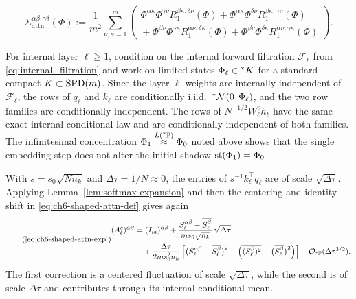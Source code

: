 \begin{theorem}
\begin{equation}
\label{eq:ch6-attn-diff-term}
\Sigma_{\mathrm{attn}}^{\alpha\beta,\gamma\delta}(\Phi) := \frac{1}{m^2}\sum_{\nu,\kappa=1}^m
\begin{pmatrix}
  \Phi^{\alpha\kappa}\Phi^{\gamma\nu} R_1^{\beta\kappa,\delta\nu}(\Phi) + \Phi^{\alpha\kappa}\Phi^{\delta\nu} R_1^{\beta\kappa,\gamma\nu}(\Phi) \\[0.3em]
  {}+ \Phi^{\beta\nu}\Phi^{\gamma\kappa} R_1^{\alpha\nu,\delta\kappa}(\Phi) + \Phi^{\beta\nu}\Phi^{\delta\kappa} R_1^{\alpha\nu,\gamma\kappa}(\Phi)
\end{pmatrix}.
\end{equation}
\end{theorem}

\begin{proofsketch}
For internal layer $\ell \ge 1$, condition on the internal forward filtration $\mathcal{F}_\ell$ from \eqref{eq:internal_filtration}
and work on limited states $\Phi_\ell \in {}^*K$ for a standard compact $K \subset \operatorname{SPD}(m)$. Since the layer-$\ell$ weights are internally independent of $\mathcal{F}_\ell$, the rows of $q_\ell$ and $k_\ell$ are conditionally i.i.d.\ ${}^*\mathcal{N}(0, \Phi_\ell)$, and the two row families are conditionally independent. The rows of $N^{-1/2} W_\ell^v h_\ell$ have the same exact internal conditional law and are conditionally independent of both families. The infinitesimal concentration $\Phi_1 \stackrel{L({}^*\mathbb{P})}{\approx} \Phi_0$ noted above shows that the single embedding step does not alter the initial shadow $\operatorname{st}(\Phi_1) = \Phi_0$.

With $s = s_0 \sqrt{N n_k}$ and $\Delta\tau = 1/N \approx 0$, the entries of $s^{-1} k_\ell^\top q_\ell$ are of scale $\sqrt{\Delta\tau}$. Applying Lemma~\ref{lem:softmax-expansion} and then the centering and identity shift in \eqref{eq:ch6-shaped-attn-def} gives again
\begin{equation*}
\tag{\ref{eq:ch6-shaped-attn-exp}}
\begin{aligned}
(A_\ell^s)^{\alpha\beta}
&= (I_m)^{\alpha\beta}
  + \frac{S_\ell^{\alpha\beta} - \overline{S_\ell^\beta}}{m s_0 \sqrt{n_k}}\,\sqrt{\Delta\tau} \\
&\quad + \frac{\Delta\tau}{2 m s_0^2 n_k}\left[\bigl(S_\ell^{\alpha\beta} - \overline{S_\ell^\beta}\bigr)^2 - \left(\overline{(S_\ell^\beta)^2} - \bigl(\overline{S_\ell^\beta}\bigr)^2\right)\right]
  + \mathcal{O}_{\hP}(\Delta\tau^{3/2}).
\end{aligned}
\end{equation*}
The first correction is a centered fluctuation of scale $\sqrt{\Delta\tau}$, while the second is of scale $\Delta\tau$ and contributes through its internal conditional mean.


\end{proofsketch}
